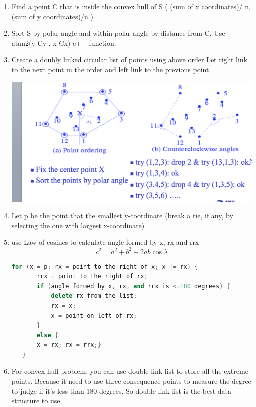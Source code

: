 \documentclass[a4paper,12pt,twoside]{book}
\begin{document}
\begin{enumerate}
\item Find a point C that is inside the convex hull of S
( (sum of x coordinates)/ n, (sum of y coordinates)/n )
\item Sort S by polar angle and within polar angle by distance from C. Use atan2(y-Cy , x-Cx) c++ function.
\item Create a doubly linked circular list of points using above order
Let right link to the next point in the order and left link to the previous point

\includegraphics[scale=0.4]{pics/convex.png} \newline
\item Let p be the point that the smallest y-coordinate 
   (break a tie, if any, by selecting the one with largest x-coordinate)
   
\item use Law of cosines to calculate  angle formed by x, rx and rrx
\[
c^{2} = a^{2}+b^{2}-2ab\cos\lambda
\]

\begin{lstlisting}[frame=single, language=c++]
 for (x = p; rx = point to the right of x; x != rx) {
       rrx = point to the right of rx;
       if (angle formed by x, rx, and rrx is <=180 degrees) {
           delete rx from the list;
           rx = x; 
           x = point on left of rx;
       } 
       else { 
       x = rx; rx = rrx;}
   } 
\end{lstlisting}

\item For convex hull problem, you can use double link list to store all the extreme points. Because it need to use three consequence points to measure the degree to judge if it's less than 180 degrees. So double link list is the best data structure to use. 

\end{enumerate}
\end{document}

